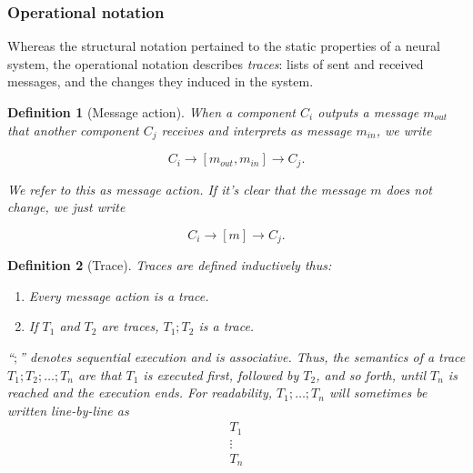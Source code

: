 \documentclass[]{scrartcl}
\theoremstyle{break}
\newtheorem{definition}{Definition}
\begin{document}
\subsubsection{Operational notation}

Whereas the structural notation pertained to the static properties of a neural system, the operational notation describes {\em traces}: lists of sent and received messages, and the changes they induced in the system.

\begin{definition}[Message action]
	When a component $C_i$ outputs a message $m_{out}$ that another component $C_j$ receives and interprets as message $m_{in}$, we write
	
	$$
		C_i \rightarrow [m_{out}, m_{in}] \rightarrow C_j.
	$$
	
	We refer to this as {\em message action}. If it's clear that the message $m$ does not change, we just write
	
	$$
		C_i \rightarrow [m] \rightarrow C_j.
	$$
\end{definition}

\begin{definition}[Trace]
	Traces are defined inductively thus:
		\begin{enumerate}
			\item Every message action is a trace.
			\item If $T_1$ and $T_2$ are traces, $T_1;T_2$ is a trace.
		\end{enumerate}
		
	``$;$'' denotes sequential execution and is associative. Thus, the semantics of a trace $T_1;T_2;\dots;T_n$ are that $T_1$ is executed first, followed by $T_2$, and so forth, until $T_n$ is reached and the execution ends.
	For readability, $T_1;\dots;T_n$ will sometimes be written line-by-line as
	$$
		\begin{array}{l}
		T_1\\
		\vdots\\
		T_n
		\end{array}
	$$
\end{definition}
\end{document}
